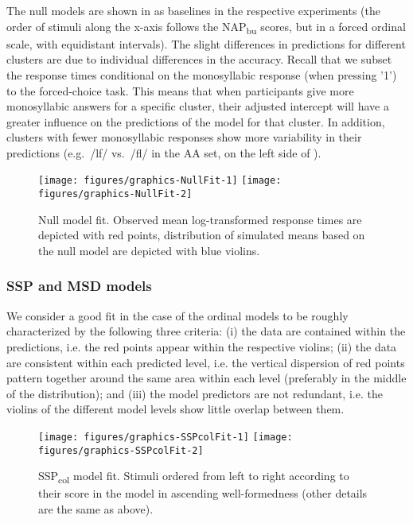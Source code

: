 The null models are shown in  as baselines in the respective experiments (the order of stimuli along the x-axis follows the NAP\textsubscript{bu} scores, but in a forced ordinal scale, with equidistant intervals). The slight differences in predictions for different clusters are due to individual differences in the accuracy. Recall that we subset the response times conditional on the monosyllabic response (when pressing '1') to the forced-choice task. This means that when participants give more monosyllabic answers for a specific cluster, their adjusted intercept will have a greater influence on the predictions of the model for that cluster. In addition, clusters with fewer monosyllabic responses show more variability in their predictions (e.g.~/lf/ vs.~/fl/ in the AA set, on the left side of ).



\begin{figure}
\texttt{[image: figures/graphics-NullFit-1]} \texttt{[image: figures/graphics-NullFit-2]} \caption{Null model fit. Observed mean log-transformed response times are depicted with red points, distribution of simulated means based on the null model are depicted with blue violins.}\label{fig:NullFit}
\end{figure}

\subsubsection{SSP and MSD models}\label{sec:traditionalModelfit}

We consider a good fit in the case of the ordinal models to be roughly characterized by the following three criteria:
(i) the data are contained within the predictions, i.e. the red points appear within the respective violins;
(ii) the data are consistent within each predicted level, i.e. the vertical dispersion of red points pattern together around the same area within each level (preferably in the middle of the distribution); and
(iii) the model predictors are not redundant, i.e. the violins of the different model levels show little overlap between them.



\begin{figure}[p]
\texttt{[image: figures/graphics-SSPcolFit-1]} \texttt{[image: figures/graphics-SSPcolFit-2]} \caption{SSP\textsubscript{col} model fit. Stimuli ordered from left to right according to their score in the model in ascending well-formedness (other details are the same as above).}\label{fig:SSPcolFit}
\end{figure}

